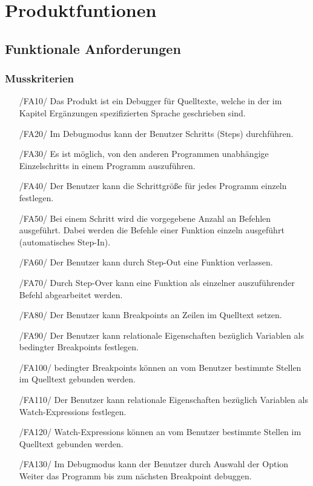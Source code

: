 \documentclass[parskip=full]{scrartcl}
\begin{document}
\newpage

\section{Produktfuntionen}
	 	\subsection{Funktionale Anforderungen}
 		\subsubsection{Musskriterien}
		\begin{itemize}
		\item[/FA10/] Das Produkt ist ein Debugger für Quelltexte, welche in der im Kapitel Ergänzungen spezifizierten Sprache geschrieben sind.
		\item[/FA20/] Im Debugmodus kann der Benutzer \glspl{Schritt} (Steps) durchführen.
		\item[/FA30/] Es ist möglich, von den anderen Programmen unabhängige \glspl{Einzelschritt} in einem Programm auszuführen.
		\item[/FA40/] Der Benutzer kann die Schrittgröße für jedes Programm einzeln festlegen.
		\item[/FA50/] Bei einem \gls{Schritt} wird die vorgegebene Anzahl an Befehlen ausgeführt. Dabei werden die Befehle einer Funktion einzeln ausgeführt (automatisches Step-In). 
		\item[/FA60/] Der Benutzer kann durch \gls{Step-Out} eine Funktion verlassen.
		\item[/FA70/] Durch \gls{Step-Over} kann eine Funktion als einzelner auszuführender Befehl abgearbeitet werden.
		\item[/FA80/] Der Benutzer kann \glspl{Breakpoint} an Zeilen im Quelltext setzen.
		\item[/FA90/] Der Benutzer kann relationale Eigenschaften bezüglich Variablen als \glspl{bedingter Breakpoint} festlegen.
		\item[/FA100/] \glspl{bedingter Breakpoint} können an vom Benutzer bestimmte Stellen im Quelltext gebunden werden.
		\item[/FA110/] Der Benutzer kann relationale Eigenschaften bezüglich Variablen als \glspl{Watch-Expression} festlegen.
		\item[/FA120/] \glspl{Watch-Expression} können an vom Benutzer bestimmte Stellen im Quelltext gebunden werden.
		\item[/FA130/] Im \gls{Debugmodus} kann der Benutzer durch Auswahl der Option Weiter das Programm bis zum nächsten Breakpoint debuggen.

\end{itemize}
\end{document}
